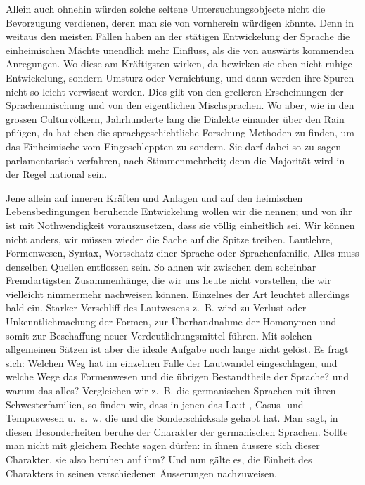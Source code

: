{Allein auch ohnehin würden solche seltene Untersuchungsobjecte nicht die Bevorzugung verdienen, deren man sie  von vornherein würdigen könnte. Denn in weitaus den meisten Fällen haben an der stätigen Entwickelung der Sprache die einheimischen Mächte unendlich mehr Einfluss, als die von auswärts kommenden Anregungen. Wo diese am Kräftigsten wirken, da bewirken sie eben nicht ruhige Entwickelung, sondern Umsturz oder Vernichtung, und dann werden ihre Spuren nicht so leicht verwischt werden. Dies gilt von den grelleren Erscheinungen der Sprachenmischung und von den eigentlichen Mischsprachen. Wo aber, wie in den grossen Culturvölkern, Jahrhunderte lang die Dialekte einander über den Rain pflügen, da hat eben die sprachgeschichtliche Forschung Methoden zu finden, um das Einheimische vom Eingeschleppten zu sondern. Sie darf dabei so zu sagen parlamentarisch \label{fp.187} verfahren, nach Stimmenmehrheit; denn die Majorität wird in der Regel national sein.

\label{sp.178}

Jene allein auf inneren Kräften und Anlagen und auf den heimischen Lebensbedingungen beruhende Entwickelung wollen wir die  nennen; und von ihr ist mit Nothwendigkeit vorauszusetzen, dass sie völlig einheitlich sei. Wir können nicht anders, wir müssen wieder die Sache auf die Spitze treiben. Lautlehre, Formenwesen, Syntax, Wortschatz einer Sprache oder Sprachenfamilie, Alles muss denselben Quellen entflossen sein. So ahnen wir zwischen dem scheinbar Fremdartigsten Zusammenhänge, die wir uns heute nicht vorstellen, die wir vielleicht nimmermehr nachweisen können. Einzelnes der Art leuchtet allerdings bald ein. Starker Verschliff des Lautwesens z.~B. wird zu Verlust oder Unkenntlichmachung der Formen, zur Überhandnahme der Homonymen und somit zur Beschaffung neuer Verdeutlichungsmittel führen. Mit solchen allgemeinen Sätzen ist aber die ideale Aufgabe noch lange nicht gelöst. Es fragt sich: Welchen Weg hat im einzelnen Falle der Lautwandel eingeschlagen, und welche Wege das Formenwesen und die übrigen Bestandtheile der Sprache? und warum das alles? Vergleichen wir z.~B. die germanischen Sprachen mit ihren Schwesterfamilien, so finden wir, dass in jenen das Laut-, Casus- und Tempuswesen u.~s.~w. die und die Sonderschicksale gehabt hat. Man sagt, in diesen Besonderheiten beruhe der Charakter der germanischen Sprachen. Sollte man nicht mit gleichem Rechte sagen dürfen: in ihnen äussere sich dieser Charakter, sie also beruhen auf ihm? Und nun gälte es, die Einheit des Charakters in seinen verschiedenen Äusserungen nachzuweisen.

}
